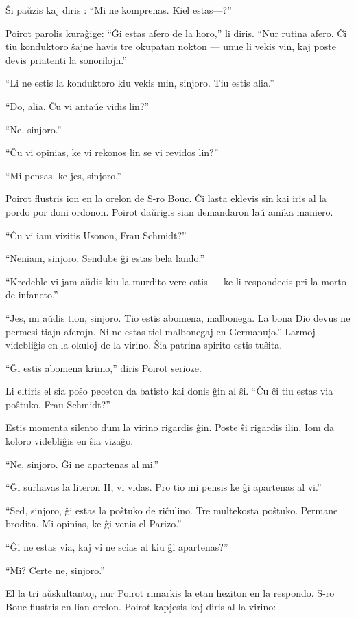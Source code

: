 Ŝi paŭzis kaj diris : ``Mi ne komprenas. Kiel estas---?''

Poirot parolis kuraĝige: ``Ĝi estas afero de la horo,'' li diris. ``Nur rutina afero. Ĉi tiu konduktoro ŝajne havis tre okupatan nokton --- unue li vekis vin, kaj poste devis priatenti la sonorilojn.''

``Li ne estis la konduktoro kiu vekis min, sinjoro. Tiu estis alia.''

``Do, alia. Ĉu vi antaŭe vidis lin?''

``Ne, sinjoro.''

``Ĉu vi opinias, ke vi rekonos lin se vi revidos lin?''

``Mi pensas, ke jes, sinjoro.''

Poirot flustris ion en la orelon de S-ro Bouc. Ĉi lasta eklevis sin kai iris al la pordo por doni ordonon. Poirot daŭrigis sian demandaron laŭ amika maniero.

``Ĉu vi iam vizitis Usonon, Frau Schmidt?''

``Neniam, sinjoro. Sendube ĝi estas bela lando.''

``Kredeble vi jam aŭdis kiu la murdito vere estis --- ke li respondecis pri la morto de infaneto.''

``Jes, mi aŭdis tion, sinjoro. Tio estis abomena, malbonega. La bona Dio devus ne permesi tiajn aferojn. Ni ne estas tiel malbonegaj en Germanujo.'' Larmoj videbliĝis en la okuloj de la virino. Ŝia patrina spirito estis tuŝita.

``Ĝi estis abomena krimo,'' diris Poirot serioze.

Li eltiris el sia poŝo peceton da batisto kai donis ĝin al ŝi. ``Ĉu ĉi tiu estas via poŝtuko, Frau Schmidt?''

Estis momenta silento dum la virino rigardis ĝin. Poste ŝi rigardis ilin. Iom da koloro videbliĝis en ŝia vizaĝo.

``Ne, sinjoro. Ĝi ne apartenas al mi.''

``Ĝi surhavas la literon H, vi vidas. Pro tio mi pensis ke ĝi apartenas al vi.''

``Sed, sinjoro, ĝi estas la poŝtuko de riĉulino. Tre multekosta poŝtuko. Permane brodita. Mi opinias, ke ĝi venis el Parizo.''

``Ĝi ne estas via, kaj vi ne scias al kiu ĝi apartenas?''

``Mi? Certe ne, sinjoro.''

El la tri aŭskultantoj, nur Poirot rimarkis la etan heziton en la respondo. S-ro Bouc flustris en lian orelon. Poirot kapjesis kaj diris al la virino:

